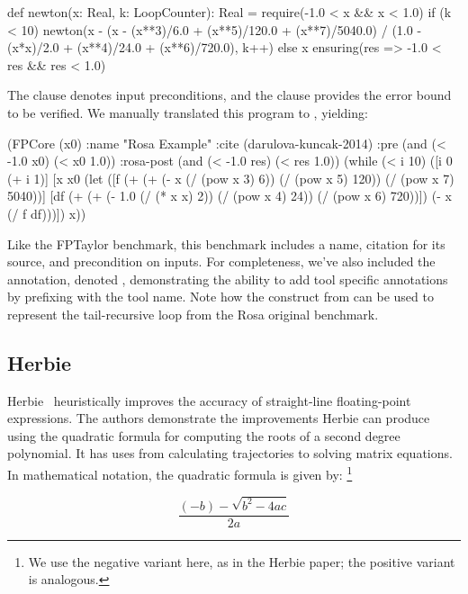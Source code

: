 \documentclass[main.tex]{subfiles}
\begin{document}
\begin{code}
def newton(x: Real, k: LoopCounter): Real = {
  require(-1.0 < x && x < 1.0)
  if (k < 10) {
    newton(x - (x - (x**3)/6.0 + (x**5)/120.0 + (x**7)/5040.0) / 
      (1.0 - (x*x)/2.0 + (x**4)/24.0 + (x**6)/720.0), k++)
  } else {
    x
  }
} ensuring(res => -1.0 < res && res < 1.0)
\end{code}

The  clause denotes input preconditions, and the
 clause provides the error bound to be verified. We manually
translated this program to \core, yielding:

\begin{code}
(FPCore (x0)
  :name "Rosa Example"
  :cite (darulova-kuncak-2014)
  :pre (and (< -1.0 x0) (< x0 1.0))
  :rosa-post (and (< -1.0 res) (< res 1.0))
  (while (< i 10)
    ([i 0 (+ i 1)]
     [x x0
      (let ([f (+ (+ (- x (/ (pow x 3) 6))
                     (/ (pow x 5) 120)) (/ (pow x 7) 5040))]
            [df (+ (+ (- 1.0 (/ (* x x) 2)) 
                      (/ (pow x 4) 24)) (/ (pow x 6) 720))])
        (- x (/ f df)))])
    x))
\end{code}

Like the FPTaylor benchmark, this benchmark includes a name,
  citation for its source, and precondition on inputs.
For completeness, we've also included the  annotation,
  denoted ,
  demonstrating the ability to add tool specific annotations
  by prefixing with the tool name.
Note how the  construct from \core
  can be used to represent the tail-recursive loop
  from the Rosa original benchmark.

\subsection{Herbie}

Herbie~\cite{pavel15} heuristically improves the accuracy of straight-line
floating-point expressions.  The authors demonstrate the improvements
Herbie can produce using the quadratic formula for computing the roots of a
second degree polynomial.  It has uses from calculating trajectories to
solving matrix equations.  In mathematical notation, the quadratic formula
is given by:%
\footnote{We use the negative variant here, as in the Herbie paper;
  the positive variant is analogous.}

\begin{equation*}
  \frac{(- b) - \sqrt{b^2 - 4ac}}{2a}
\end{equation*}
\end{document}
